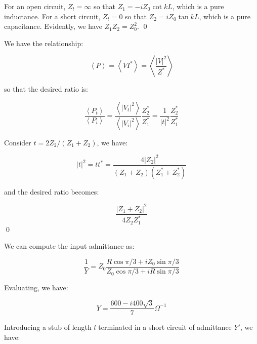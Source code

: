 \documentclass[12pt]{article}
\begin{document}
For an open circuit, $Z_{t} = \infty$ so that $Z_{1} = -iZ_{0} \cot{kL}$, which is a pure inductance. For a short circuit, $Z_{t} = 0$ so that $Z_{2} = iZ_{0} \tan{kL}$, which is a pure capacitance. Evidently, we have $Z_{1} Z_{2} = Z_{0}^{2}$.
\qed


We have the relationship:

\begin{equation}
    \left\langle P \right\rangle = \left\langle VI^{*} \right\rangle = \left\langle \frac{\left\lvert V \right\rvert^{2}}{Z^{*}} \right\rangle
\end{equation}

so that the desired ratio is:

\begin{equation}
    \frac{\left\langle P_{t} \right\rangle}{\left\langle P_{i} \right\rangle} = \frac{\left\langle \left\lvert V_{t} \right\rvert^{2} \right\rangle}{\left\langle \left\lvert V_{i} \right\rvert^{2} \right\rangle} \frac{Z_{2}^{*}}{Z_{1}^{*}} = \frac{1}{\left\lvert t \right\rvert^{2}} \frac{Z_{2}^{*}}{Z_{1}^{*}}
\end{equation}

Consider $t = 2Z_{2}/(Z_{1} + Z_{2})$, we have:

\begin{equation}
    \left\lvert t \right\rvert^{2} = t t^{*} = \frac{4\left\lvert Z_{2} \right\rvert^{2}}{(Z_{1} + Z_{2})(Z_{1}^{*} + Z_{2}^{*})}
\end{equation}

and the desired ratio becomes:

\begin{equation}
    \frac{\left\lvert Z_{1} + Z_{2} \right\rvert^{2}}{4Z_{2} Z_{1}^{*}}
\end{equation}
\qed


We can compute the input admittance as:

\begin{equation}
    \frac{1}{Y} = Z_{0} \frac{R \cos{\pi/3} + iZ_{0} \sin{\pi/3}}{Z_{0} \cos{\pi/3} + iR \sin{\pi/3}}
\end{equation}

Evaluating, we have:

\begin{equation}
    Y = \frac{600 - i400\sqrt{3}}{7} \unit{\Omega^{-1}}
\end{equation}

Introducing a stub of length $l$ terminated in a short circuit of admittance $Y'$, we have:
\end{document}
